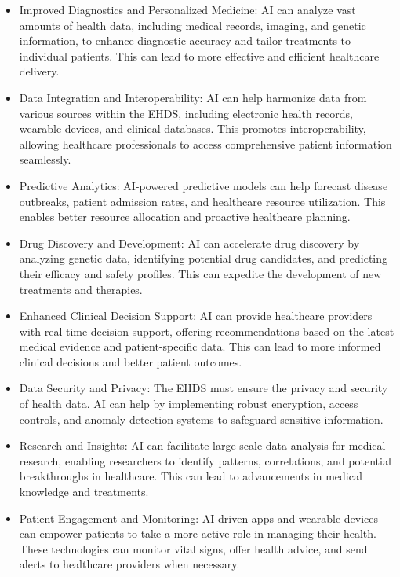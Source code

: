 \begin{itemize}
    \item Improved Diagnostics and Personalized Medicine: AI can analyze vast amounts of health data, including medical records, imaging, and genetic information, to enhance diagnostic accuracy and tailor treatments to individual patients. This can lead to more effective and efficient healthcare delivery.
\item Data Integration and Interoperability: AI can help harmonize data from various sources within the EHDS, including electronic health records, wearable devices, and clinical databases. This promotes interoperability, allowing healthcare professionals to access comprehensive patient information seamlessly.

\item Predictive Analytics: AI-powered predictive models can help forecast disease outbreaks, patient admission rates, and healthcare resource utilization. This enables better resource allocation and proactive healthcare planning.

\item Drug Discovery and Development: AI can accelerate drug discovery by analyzing genetic data, identifying potential drug candidates, and predicting their efficacy and safety profiles. This can expedite the development of new treatments and therapies.

\item Enhanced Clinical Decision Support: AI can provide healthcare providers with real-time decision support, offering recommendations based on the latest medical evidence and patient-specific data. This can lead to more informed clinical decisions and better patient outcomes.

\item Data Security and Privacy: The EHDS must ensure the privacy and security of health data. AI can help by implementing robust encryption, access controls, and anomaly detection systems to safeguard sensitive information.

\item Research and Insights: AI can facilitate large-scale data analysis for medical research, enabling researchers to identify patterns, correlations, and potential breakthroughs in healthcare. This can lead to advancements in medical knowledge and treatments.

\item Patient Engagement and Monitoring: AI-driven apps and wearable devices can empower patients to take a more active role in managing their health. These technologies can monitor vital signs, offer health advice, and send alerts to healthcare providers when necessary.


\end{itemize}
